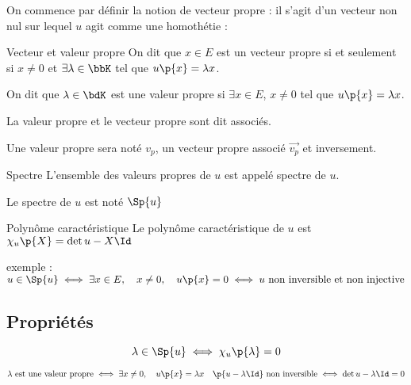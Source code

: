 \documentclass[a4paper,french,bookmarks]{book}
\begin{document}
    On commence par définir la notion de vecteur propre : il s'agit d'un vecteur non nul sur lequel $u$ agit comme une homothétie :
    \begin{definition}{Vecteur et valeur propre}{}
        On dit que $x \in E$ est un vecteur propre si et seulement si $x \neq 0$ et $\exists \lambda \in \bbK$ tel que $u\p{x} = \lambda x$.
        
        On dit que $\lambda \in \bdK$ est une valeur propre si $\exists x \in E$, $x \neq 0$ tel que $u\p{x} = \lambda x$.
        
        La valeur propre et le vecteur propre sont dit associés.
    \end{definition}
    \begin{notation}
        Une valeur propre sera noté $v_p$, un vecteur propre associé $\vec{v_p}$ et inversement.
    \end{notation}
    
    \begin{definition}{Spectre}
        L'ensemble des valeurs propres de $u$ est appelé spectre de $u$.
    \end{definition}
    
    \begin{notation}
        Le spectre de $u$ est noté $\Sp{u}$
    \end{notation}
    
    \begin{definition}{Polynôme caractéristique}{}
        Le polynôme caractéristique de $u$ est $\chi_u\p{X} = \det{u - X\Id}$
    \end{definition}
    
    
    exemple : $u \in \Sp{u} \iff \exists x \in E,\quad x \neq 0,\quad u\p{x} = 0\iff u \ \text{non inversible et non injective}$
    
    \subsection{Propriétés}
    
    \begin{property}{}{}
        \[ \lambda \in \Sp{u} \iff \chi_u\p{\lambda} = 0\]
    \end{property}
    \begin{nproof}
        \[ \lambda \ \text{est une valeur propre} \iff \exists x \neq 0,\quad u\p{x} = \lambda x \quad \p{u - \lambda \Id} \ \text{non inversible} \iff \det{u - \lambda \Id} = 0\]
    \end{nproof}
    
\end{document}
